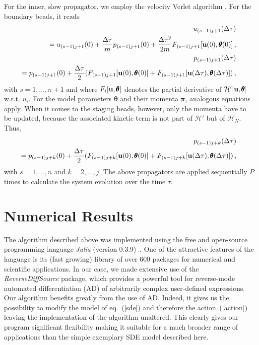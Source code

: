\documentclass[12pt,a4paper,final]{iopart}
\newcommand{\bt}{\pmb\theta}
\newcommand{\vc}[1]{{\bf #1 }}
\begin{document}
For the inner, slow propagator, we employ the velocity Verlet algorithm \cite{swope_1982_verlet}.
For the boundary beads, it reads
\begin{eqnarray}
  u_{(s-1)j+1}(\Delta\tau) \nonumber \\
  = u_{(s-1)j+1}(0)
  +
  \frac{\Delta\tau}{m} p_{(s-1)j+1}(0)
  +
  \frac{\Delta \tau^2}{2m}
  F_{(s-1)j+1}[\vc u(0),{\pmb\theta}(0)]\,,\\
  p_{(s-1)j+1}(\Delta\tau) \nonumber \\
  = p_{(s-1)j+1}(0)
  +
  \frac{\Delta\tau}{2}
  (
  F_{(s-1)j+1}[\vc u(0),{\pmb\theta}(0)]
  +
  F_{(s-1)j+1}[\vc u(\Delta\tau),{\pmb\theta}(\Delta\tau)]
  )\,,
\end{eqnarray}
with $s=1,\dots,n+1$ and where $F_i[\vc u,{\pmb\theta}]$ denotes the partial derivative of $\mathcal H'[\vc u,{\pmb\theta}]$ w.r.t. $u_i$.
For the model parameters $\bt$ and their momenta ${\pmb\pi}$, analogous equations apply.
When it comes to the staging beads, however, only the momenta have to be updated, because the associated kinetic term is not part of $\mathcal H'$ but of $\mathcal H_N$.
Thus,
\begin{eqnarray}
  p_{(s-1)j+k}(\Delta\tau) \nonumber \\
  =
  p_{(s-1)j+k}(0)
  +
  \frac{\Delta\tau}{2}
  (
  F_{(s-1)j+k}[\vc u(0),{\pmb\theta}(0)]
  +
  F_{(s-1)j+k}[\vc u(\Delta\tau),{\pmb\theta}(\Delta\tau)]
  )
  \,,
\end{eqnarray}
with $s=1,\dots,n$ and $k=2,\dots,j$. The above propagators are applied sequentially $P$ times to calculate the system evolution over the time $\tau$.



\section{Numerical Results}\label{numerical_results}

The algorithm described above was implemented using the free and open-source programming language \emph{Julia} (version 0.3.9)~\cite{julia_web}. One of the attractive features of the language is its (fast growing) library of over 600 packages for numerical and scientific applications.
In our case, we made extensive use of the \emph{ReverseDiffSource} package, which provides a powerful tool for reverse-mode automated differentiation (AD) of arbitrarily complex user-defined expressions. Our algorithm benefits greatly from the use of AD. Indeed, it gives us the possibility to modify the model of eq.~(\ref{sde}) and therefore the action~(\ref{action}) leaving the implementation of the algorithm unaltered. This clearly gives our program significant flexibility making it suitable for a much broader range of applications than the simple exemplary SDE model described here.
\end{document}
